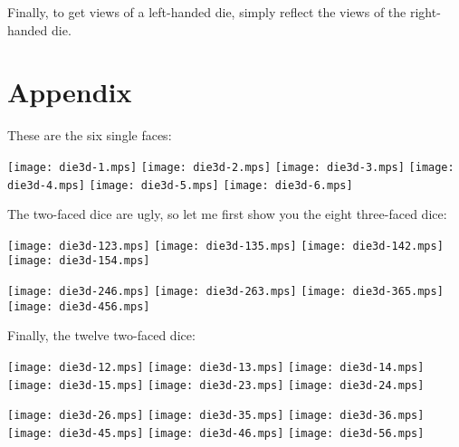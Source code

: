 \documentclass{article}
\begin{document}
Finally, to get views of a left-handed die, simply reflect the views of 
the right-handed die.

\section{Appendix}

\parindent 0pt
These are the six single faces:

\bigskip
\texttt{[image: die3d-1.mps]}\quad
\texttt{[image: die3d-2.mps]}\quad
\texttt{[image: die3d-3.mps]}\quad
\texttt{[image: die3d-4.mps]}\quad
\texttt{[image: die3d-5.mps]}\quad
\texttt{[image: die3d-6.mps]}

\bigskip
\filbreak
The two-faced dice are ugly, so let me first show you the eight 
three-faced dice:

\bigskip
\texttt{[image: die3d-123.mps]}\quad
\texttt{[image: die3d-135.mps]}\quad
\texttt{[image: die3d-142.mps]}\quad
\texttt{[image: die3d-154.mps]}

\bigskip
\texttt{[image: die3d-246.mps]}\quad
\texttt{[image: die3d-263.mps]}\quad
\texttt{[image: die3d-365.mps]}\quad
\texttt{[image: die3d-456.mps]}

\bigskip
\filbreak
Finally, the twelve two-faced dice:

\bigskip
\texttt{[image: die3d-12.mps]}\quad
\texttt{[image: die3d-13.mps]}\quad
\texttt{[image: die3d-14.mps]}\quad
\texttt{[image: die3d-15.mps]}\quad
\texttt{[image: die3d-23.mps]}\quad
\texttt{[image: die3d-24.mps]}

\bigskip
\texttt{[image: die3d-26.mps]}\quad
\texttt{[image: die3d-35.mps]}\quad
\texttt{[image: die3d-36.mps]}\quad
\texttt{[image: die3d-45.mps]}\quad
\texttt{[image: die3d-46.mps]}\quad
\texttt{[image: die3d-56.mps]}

\filbreak
\end{document}
